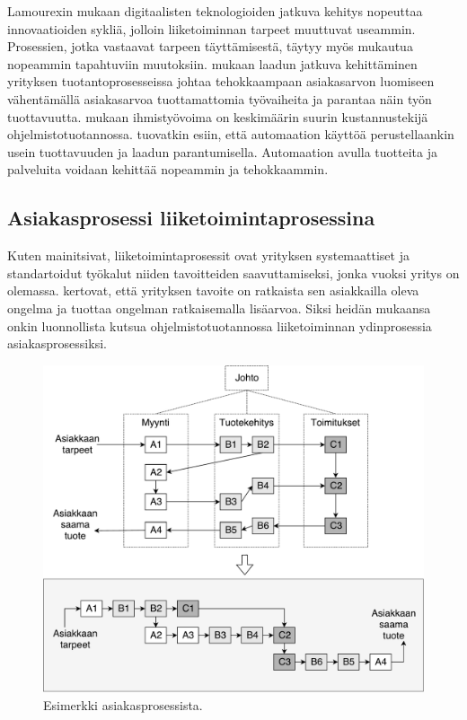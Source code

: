 \documentclass[finnish,12pt,a4paper,pdftex]{article}
\begin{document}
Lamourexin \citeyearpar{lamoureux} mukaan digitaalisten teknologioiden jatkuva kehitys nopeuttaa innovaatioiden sykliä, jolloin liiketoiminnan tarpeet muuttuvat useammin. Prosessien, jotka vastaavat tarpeen täyttämisestä, täytyy myös mukautua nopeammin tapahtuviin muutoksiin. \cite{teollisuustalous} mukaan laadun jatkuva kehittäminen yrityksen tuotantoprosesseissa johtaa tehokkaampaan asiakasarvon luomiseen vähentämällä asiakasarvoa tuottamattomia työvaiheita ja parantaa näin työn tuottavuutta. \cite{ohjelmistotuotanto} mukaan ihmistyövoima on keskimäärin suurin kustannustekijä ohjelmistotuotannossa. \cite{teollisuustalous} tuovatkin esiin, että automaation käyttöä perustellaankin usein tuottavuuden ja laadun parantumisella. Automaation avulla tuotteita ja palveluita voidaan kehittää nopeammin ja tehokkaammin.

\subsection{Asiakasprosessi liiketoimintaprosessina}

Kuten \cite{teollisuustalous} mainitsivat, liiketoimintaprosessit ovat yrityksen systemaattiset ja standartoidut työkalut niiden tavoitteiden saavuttamiseksi, jonka vuoksi yritys on olemassa. \cite{ohjelmistotuotanto} kertovat, että yrityksen tavoite on ratkaista sen asiakkailla oleva ongelma ja tuottaa ongelman ratkaisemalla lisäarvoa. Siksi heidän mukaansa onkin luonnollista kutsua ohjelmistotuotannossa liiketoiminnan ydinprosessia asiakasprosessiksi.

\begin{figure}[!h]
    \centering
    \includegraphics[scale=0.45]{images/Prosessikaavion.pdf}
    \caption{Esimerkki asiakasprosessista. \citep{ohjelmistotuotanto}}
    \label{fig:liikark}
\end{figure}
\end{document}
